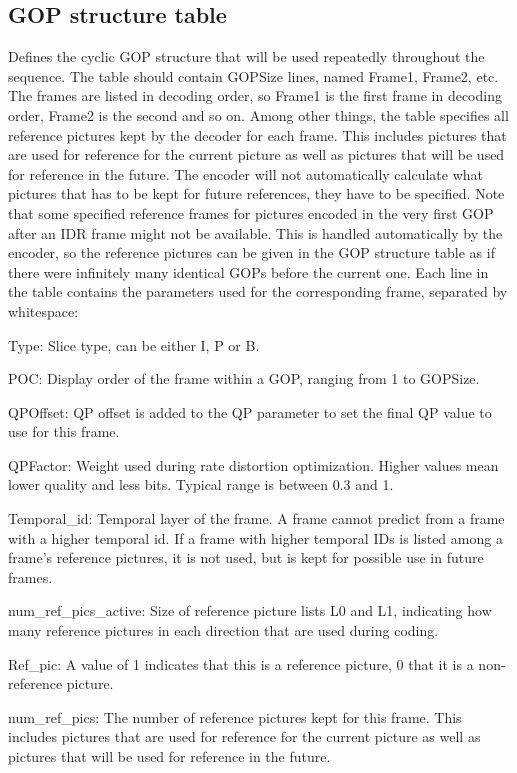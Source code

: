 \documentclass[a4paper,11pt]{jctvcdoc}
\begin{document}
\subsection{GOP structure table}
Defines the cyclic GOP structure that will be used repeatedly
throughout the sequence. The table should contain GOPSize lines,
named Frame1, Frame2, etc. The frames are listed in decoding
order, so Frame1 is the first frame in decoding order, Frame2 is
the second and so on. Among other things, the table specifies all
reference pictures kept by the decoder for each frame. This
includes pictures that are used for reference for the current
picture as well as pictures that will be used for reference in
the future. The encoder will not automatically calculate what
pictures that has to be kept for future references, they have to
be specified. Note that some specified reference frames for
pictures encoded in the very first GOP after an IDR frame might
not be available. This is handled automatically by the encoder,
so the reference pictures can be given in the GOP structure table
as if there were infinitely many identical GOPs before the
current one. Each line in the table contains the parameters used
for the corresponding frame, separated by whitespace:

Type: Slice type, can be either I, P or B.

POC: Display order of the frame within a GOP, ranging from 1 to
GOPSize.

QPOffset: QP offset is added to the QP parameter to set the final
QP value to use for this frame.

QPFactor: Weight used during rate distortion optimization. Higher
values mean lower quality and less bits. Typical range is between
0.3 and 1.

Temporal_id: Temporal layer of the frame. A frame cannot predict
from a frame with a higher temporal id. If a frame with higher
temporal IDs is listed among a frame's reference pictures, it is
not used, but is kept for possible use in future frames.

num_ref_pics_active: Size of reference picture lists L0 and L1,
indicating how many reference pictures in each direction that are
used during coding.

Ref_pic: A value of 1 indicates that this is a reference picture,
0 that it is a non-reference picture.

num_ref_pics: The number of reference pictures kept for this frame.
This includes pictures that are used for reference for the
current picture as well as pictures that will be used for
reference in the future.
\end{document}
